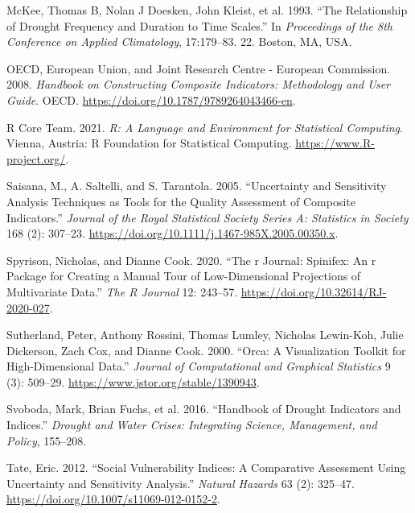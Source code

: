 \documentclass[
]{interact}
\newlength{\cslhangindent}
\newlength{\cslentryspacingunit} %
\newenvironment{CSLReferences}[2] %
 {%
  \setlength{\parindent}{0pt}
  \ifodd #1
  \let\oldpar\par
  \def\par{\hangindent=\cslhangindent\oldpar}
  \fi
  \setlength{\parskip}{#2\cslentryspacingunit}
 }%
 {}
\begin{document}
\begin{CSLReferences}{1}{0}
\leavevmode{}%
McKee, Thomas B, Nolan J Doesken, John Kleist, et al. 1993. {``The
Relationship of Drought Frequency and Duration to Time Scales.''} In
\emph{Proceedings of the 8th Conference on Applied Climatology},
17:179--83. 22. Boston, MA, USA.

\leavevmode{}%
OECD, European Union, and Joint Research Centre - European Commission.
2008. \emph{Handbook on {Constructing} {Composite} {Indicators}:
{Methodology} and {User} {Guide}}. OECD.
\url{https://doi.org/10.1787/9789264043466-en}.

\leavevmode{}%
R Core Team. 2021. \emph{R: A Language and Environment for Statistical
Computing}. Vienna, Austria: R Foundation for Statistical Computing.
\url{https://www.R-project.org/}.

\leavevmode{}%
Saisana, M., A. Saltelli, and S. Tarantola. 2005. {``{Uncertainty and
Sensitivity Analysis Techniques as Tools for the Quality Assessment of
Composite Indicators}.''} \emph{Journal of the Royal Statistical Society
Series A: Statistics in Society} 168 (2): 307--23.
\url{https://doi.org/10.1111/j.1467-985X.2005.00350.x}.

\leavevmode{}%
Spyrison, Nicholas, and Dianne Cook. 2020. {``The r Journal: Spinifex:
An r Package for Creating a Manual Tour of Low-Dimensional Projections
of Multivariate Data.''} \emph{The R Journal} 12: 243--57.
\url{https://doi.org/10.32614/RJ-2020-027}.

\leavevmode{}%
Sutherland, Peter, Anthony Rossini, Thomas Lumley, Nicholas Lewin-Koh,
Julie Dickerson, Zach Cox, and Dianne Cook. 2000. {``Orca: {A}
{Visualization} {Toolkit} for {High}-{Dimensional} {Data}.''}
\emph{Journal of Computational and Graphical Statistics} 9 (3): 509--29.
\url{https://www.jstor.org/stable/1390943}.

\leavevmode{}%
Svoboda, Mark, Brian Fuchs, et al. 2016. {``Handbook of Drought
Indicators and Indices.''} \emph{Drought and Water Crises: Integrating
Science, Management, and Policy}, 155--208.

\leavevmode{}%
Tate, Eric. 2012. {``Social Vulnerability Indices: A Comparative
Assessment Using Uncertainty and Sensitivity Analysis.''} \emph{Natural
Hazards} 63 (2): 325--47.
\url{https://doi.org/10.1007/s11069-012-0152-2}.


\end{CSLReferences}
\end{document}
